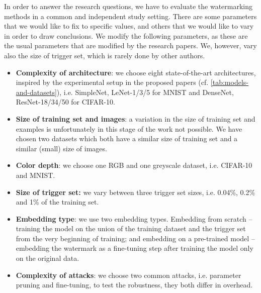
In order to answer the research questions, we have to evaluate the watermarking methods in a common and independent study setting. There are some parameters that we would like to fix to specific values, and others that we would like to vary in order to draw conclusions. We modify the following parameters, as these are the usual parameters that are modified by the research papers. We, however, vary also the size of trigger set, which is rarely done by other authors.

\begin{itemize}
    \item \textbf{Complexity of architecture}: we choose eight state-of-the-art architectures, inspired by the experimental setup in the proposed papers (cf. \cref{tab:models-and-datasets}), i.e. SimpleNet, LeNet-1/3/5 for MNIST and DenseNet, ResNet-18/34/50 for CIFAR-10.
    \item \textbf{Size of training set and images}: a variation in the size of training set and examples is unfortunately in this stage of the work not possible. We have chosen two datasets which both have a similar size of training set and a similar (small) size of images. 
    \item \textbf{Color depth}: we choose one RGB and one greyscale dataset, i.e. CIFAR-10 and MNIST.
    \item \textbf{Size of trigger set:} we vary between three trigger set sizes, i.e. 0.04\%, 0.2\% and 1\% of the training set.
    \item \textbf{Embedding type}: we use two embedding types. Embedding from scratch -- training the model on the union of the training dataset and the trigger set from the very beginning of training; and embedding on a pre-trained model -- embedding the watermark as a fine-tuning step after training the model only on the original data.
    \item \textbf{Complexity of attacks}: we choose two common attacks, i.e. parameter pruning and fine-tuning, to test the robustness, they both differ in overhead.
\end{itemize}

